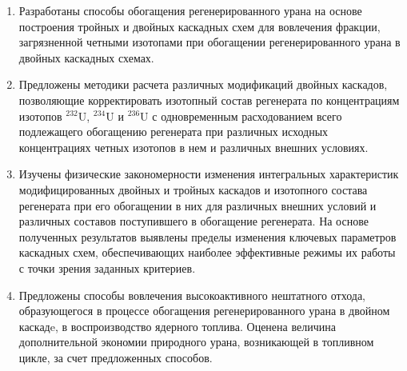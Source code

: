 {\novelty}
\begin{enumerate}
  \item Разработаны способы обогащения регенерированного урана на основе построения тройных и двойных каскадных схем для вовлечения фракции, загрязненной четными изотопами при обогащении регенерированного урана в двойных каскадных схемах.
  \item Предложены методики расчета различных модификаций двойных каскадов, позволяющие корректировать изотопный состав регенерата по концентрациям изотопов $^{232}$U, $^{234}$U и $^{236}$U с одновременным расходованием всего подлежащего обогащению регенерата при различных исходных концентрациях четных изотопов в нем и различных внешних условиях.
  \item Изучены физические закономерности изменения интегральных характеристик модифицированных двойных и тройных каскадов и  изотопного состава регенерата при его обогащении в них для различных внешних условий и различных составов поступившего в обогащение регенерата. На основе полученных результатов выявлены пределы изменения ключевых параметров каскадных схем, обеспечивающих наиболее эффективные режимы их работы с точки зрения заданных критериев.
  \item Предложены способы вовлечения высокоактивного нештатного отхода, образующегося в процессе обогащения регенерированного урана в двойном каскадe, в воспроизводство ядерного топлива. Оценена величина дополнительной экономии природного урана, возникающей в топливном цикле, за счет предложенных способов.
\end{enumerate}


